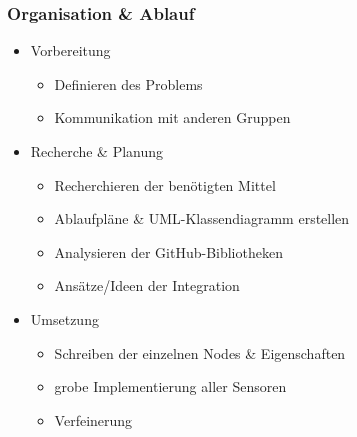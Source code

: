 \documentclass{beamer}
\begin{document}
 \begin{frame}
\frametitle{Organisation \& Ablauf}
\begin{itemize}
\item<1-> Vorbereitung
\begin{itemize}
\item<2-3> Definieren des Problems
\item<3> Kommunikation mit anderen Gruppen
\end{itemize}
\item<4-> Recherche \& Planung
\begin{itemize}
\item<5-8> Recherchieren der benötigten Mittel
\item<6-8> Ablaufpläne \& UML-Klassendiagramm erstellen
\item<7-8> Analysieren der GitHub-Bibliotheken
\item<8> Ansätze/Ideen der Integration
\end{itemize}
 \item<9-> Umsetzung
\begin{itemize}
\item<10-12> Schreiben der einzelnen Nodes \& Eigenschaften
\item<11-12> grobe Implementierung aller Sensoren
\item<12> Verfeinerung
\end{itemize}
\end{itemize}
\end{frame}
\end{document}
